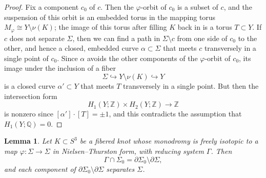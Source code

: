 \documentclass[11pt]{amsart}
\newtheorem {lemma}[theorem]{Lemma}
\numberwithin{equation}{section}
\numberwithin{theorem}{section}
\theoremstyle{definition}
\newcommand{\Z}{\mathbb{Z}}
\newcommand{\Q}{\mathbb{Q}}
\renewcommand{\phi}{\varphi}
\begin{document}
\begin{proof}
Fix a component $c_0$ of $c$.  Then the $\phi$-orbit of $c_0$ is a subset of $c$, and the suspension of this orbit is an embedded torus in the mapping torus $M_\phi \cong Y \setminus \nu(K)$; the image of this torus after filling $K$ back in is a torus $T \subset Y$.  If  $c$ does not separate $\Sigma$, then we can find a path in $\Sigma \setminus c$ from one side of $c_0$ to the other, and hence a closed, embedded curve $\alpha \subset \Sigma$ that meets $c$ transversely in a single point of $c_0$.  Since $\alpha$ avoids the other components of the $\phi$-orbit of $c_0$, its image under the inclusion of a fiber
\[ \Sigma \hookrightarrow Y \setminus \nu(K) \hookrightarrow Y \]
is a closed curve $\alpha' \subset Y$ that meets $T$ transversely in a single point.  But then the intersection form
\[ H_1(Y;\Z) \times H_2(Y;\Z) \to \Z \]
is nonzero since $[\alpha'] \cdot [T] = \pm1$, and this contradicts the assumption that $H_1(Y;\Q) = 0$.
\end{proof}


\begin{lemma} \label{lem:outermost-separating}
Let $K \subset S^3$ be a fibered knot whose monodromy is freely isotopic to a map $\phi: \Sigma \to \Sigma$ in Nielsen--Thurston form, with reducing system $\Gamma$.   Then 
\[ \Gamma \cap \Sigma_0 = \partial\Sigma_0 \setminus \partial\Sigma, \]
and each component of  $\partial\Sigma_0 \setminus \partial\Sigma$ separates $\Sigma$.
\end{lemma}
\end{document}
